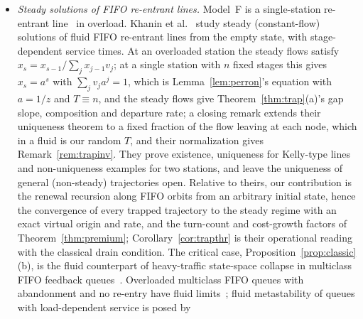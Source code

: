\begin{itemize}[leftmargin=*,nosep]
empty engine on the 300k cell, 3000\,s after the burst, with the remaining work taken as realized and equal to the fluid's
(, \texttt{kendall\_numbers}). Emptying then has probability 0.35 at $\rho=1.01$, 0.12 at 1.02,
$4\times10^{-3}$ at 1.05, $10^{-5}$ at 1.10, $4\times10^{-23}$ at 1.35 and $2\times10^{-54}$ at 1.65. A realized $w$
fluctuates around the fluid value, and if only the class composition is known, with the turn counts unrealized, the probability is
the product of per-session transforms, which by Jensen's inequality is larger. Hits return before the queue empties, so these
numbers are not bounds on a spontaneous exit; they indicate that it matters only within a few percent of $\lmiss$. The branching description is classical and claimed as such.
\item \emph{Steady solutions of FIFO re-entrant lines.} Model~F is a single-station re-entrant line~\citep{kumar1993reentrant}
in overload. Khanin et al.~\citep{khanin2001steady} study steady (constant-flow) solutions of fluid FIFO re-entrant lines from the
empty state, with stage-dependent service times. At an overloaded station the steady flows satisfy
$x_s=x_{s-1}/\sum_jx_{j-1}v_j$; at a single station with $n$ fixed stages this gives $x_s=a^s$ with $\sum_jv_ja^j=1$, which is
Lemma~\ref{lem:perron}'s equation with $a=1/z$ and $T\equiv n$, and the steady flows give Theorem~\ref{thm:trap}(a)'s gap slope,
composition and departure rate; a closing remark extends their uniqueness theorem to a fixed fraction of the flow leaving at each node, which in
a fluid is our random $T$, and their normalization gives Remark~\ref{rem:trapinv}. They prove existence, uniqueness for
Kelly-type lines and non-uniqueness examples for two stations, and leave the uniqueness of general (non-steady) trajectories open.
Relative to theirs, our contribution is the renewal recursion along FIFO orbits from an arbitrary initial state, hence the
convergence of every trapped trajectory to the steady regime with an exact virtual origin and rate, and the turn-count and
cost-growth factors of Theorem~\ref{thm:premium}; Corollary~\ref{cor:trapthr} is their operational reading with the classical drain
condition. The critical case,
Proposition~\ref{prop:classic}(b), is the fluid counterpart of heavy-traffic state-space collapse in multiclass FIFO feedback
queues~\citep{reiman1988multiclass,dai1995multiclass}. Overloaded multiclass FIFO queues with abandonment and no re-entry have fluid
limits~\citep{jennings2013fluid}; fluid metastability of queues with load-dependent service is posed by

\end{itemize}

